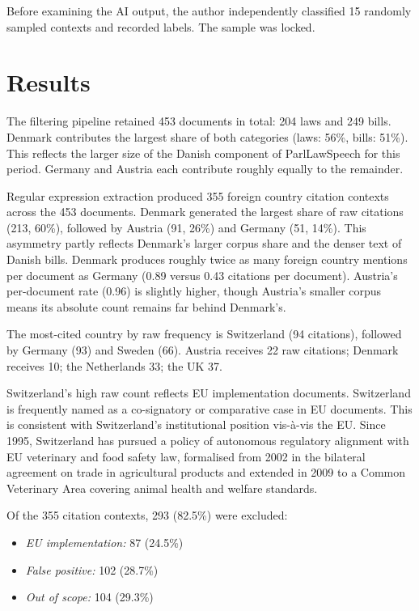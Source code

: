 \documentclass[twocolumn, 10pt, a4paper]{article}
\begin{document}
Before examining the AI output, the author independently classified 15 randomly
sampled contexts and recorded labels. The sample was locked.

\section{Results}

The filtering pipeline retained 453 documents in total: 204 laws and 249 bills.
Denmark contributes the largest share of both categories (laws: 56\%, bills: 51\%).
This reflects the larger size of the Danish component of ParlLawSpeech for this
period. Germany and Austria each contribute roughly equally to the remainder.

Regular expression extraction produced 355 foreign country citation contexts across
the 453 documents. Denmark generated the largest share of raw citations (213, 60\%),
followed by Austria (91, 26\%) and Germany (51, 14\%). This asymmetry partly reflects
Denmark's larger corpus share and the denser text of Danish bills. Denmark produces
roughly twice as many foreign country mentions per document as Germany (0.89 versus
0.43 citations per document). Austria's per-document rate (0.96) is slightly higher,
though Austria's smaller corpus means its absolute count remains far behind Denmark's.

The most-cited country by raw frequency is Switzerland (94 citations), followed by
Germany (93) and Sweden (66). Austria receives 22 raw citations; Denmark receives 10;
the Netherlands 33; the UK 37.

Switzerland's high raw count reflects EU implementation documents. Switzerland is
frequently named as a co-signatory or comparative case in EU documents. This is
consistent with Switzerland's institutional position vis-\`{a}-vis the EU. Since
1995, Switzerland has pursued a policy of autonomous regulatory alignment with EU
veterinary and food safety law, formalised from 2002 in the bilateral agreement on
trade in agricultural products and extended in 2009 to a Common Veterinary Area
covering animal health and welfare standards.

Of the 355 citation contexts, 293 (82.5\%) were excluded:
\begin{itemize}
  \item \textit{EU implementation:} 87 (24.5\%)
  \item \textit{False positive:} 102 (28.7\%)
  \item \textit{Out of scope:} 104 (29.3\%)
\end{itemize}
\end{document}
